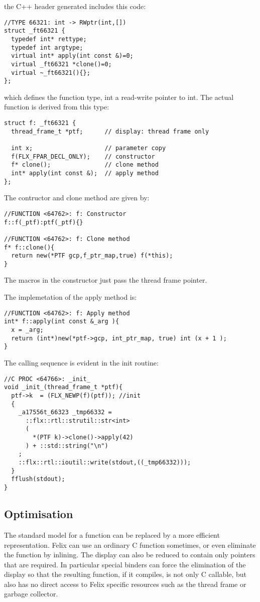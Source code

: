 \documentclass[oneside]{book}
\begin{document}
the C++ header generated includes this code:

\begin{verbatim}
//TYPE 66321: int -> RWptr(int,[])
struct _ft66321 {
  typedef int* rettype;
  typedef int argtype;
  virtual int* apply(int const &)=0;
  virtual _ft66321 *clone()=0;
  virtual ~_ft66321(){};
};
\end{verbatim}

which defines the function type, int a read-write pointer to int.
The actual function is derived from this type:

\begin{verbatim}
struct f: _ft66321 {
  thread_frame_t *ptf;      // display: thread frame only

  int x;                    // parameter copy
  f(FLX_FPAR_DECL_ONLY);    // constructor
  f* clone();               // clone method
  int* apply(int const &);  // apply method
};
\end{verbatim}

The contructor and clone method are given by:
\begin{verbatim}
//FUNCTION <64762>: f: Constructor
f::f(_ptf):ptf(_ptf){}

//FUNCTION <64762>: f: Clone method
f* f::clone(){
  return new(*PTF gcp,f_ptr_map,true) f(*this);
}
\end{verbatim}
The macros in the constructor just pass the thread frame pointer.

The implemetation of the apply method is:
\begin{verbatim}
//FUNCTION <64762>: f: Apply method
int* f::apply(int const &_arg ){
  x = _arg;
  return (int*)new(*ptf->gcp, int_ptr_map, true) int (x + 1 );
}
\end{verbatim}

The calling sequence is evident in the init routine:
\begin{verbatim}
//C PROC <64766>: _init_
void _init_(thread_frame_t *ptf){
  ptf->k  = (FLX_NEWP(f)(ptf)); //init
  {
    _a17556t_66323 _tmp66332 = 
      ::flx::rtl::strutil::str<int>
      (
        *(PTF k)->clone()->apply(42)
      ) + ::std::string("\n") 
    ;
    ::flx::rtl::ioutil::write(stdout,((_tmp66332)));
  }
  fflush(stdout);
}
\end{verbatim}

\subsection{Optimisation}
The standard model for a function can be replaced by a more efficient representation.
Felix can use an ordinary C function sometimes, or even eliminate the function
by inlining. The display can also be reduced to contain only pointers that are
required. In particular special binders can force the elimination of the display
so that the resulting function, if it compiles, is not only C callable, but also
has no direct access to Felix specific resources such as the thread frame or
garbage collector.
\end{document}
